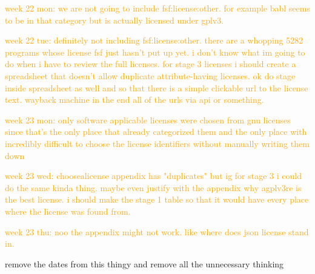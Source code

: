 \textcolor{orange}{week 22 mon: we are not going to include fsf:license:other. for example babl seems to be in that category but is actually licensed under gplv3.}

\textcolor{orange}{week 22 tue: definitely not including fsf:license:other. there are a whopping 5282 programs whose license fsf just hasn't put up yet. i don't know what im going to do when i have to review the full licenses. for stage 3 licenses i should create a spreadsheet that doesn't allow duplicate attribute-having licenses. ok do stage inside spreadsheet as well and so that there is a simple clickable url to the license text. wayback machine in the end all of the urls via api or something.}

\textcolor{orange}{week 23 mon: only software applicable licenses were chosen from gnu licenses since that's the only place that already categorized them and the only place with incredibly difficult to choose the license identifiers without manually writing them down}

\textcolor{orange}{week 23 wed: choosealicense appendix has "duplicates" but ig for stage 3 i could do the same kinda thing. maybe even justify with the appendix why agplv3re is the best license. i should make the stage 1 table so that it would have every place where the license was found from.}

\textcolor{orange}{week 23 thu: noo the appendix might not work. like where does json license stand in.}

remove the dates from this thingy and remove all the unnecessary thinking

